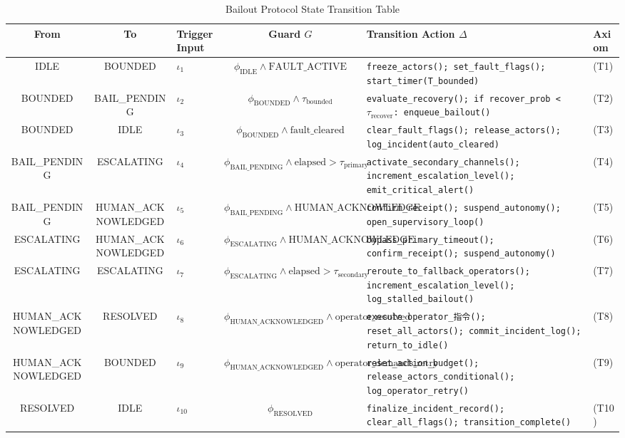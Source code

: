 \begin{table}[htbp]
\centering
\caption{Bailout Protocol State Transition Table}
\label{tab:transitions}
\begin{tabular}{|c|c|l|c|p{4.5cm}|p{3.5cm}|}
\hline
\textbf{From} & \textbf{To} & \textbf{Trigger Input} & \textbf{Guard $G$} & \textbf{Transition Action $\Delta$} & \textbf{Axiom} \\ \hline
IDLE & BOUNDED & $\iota_1$ & $\phi_{\text{IDLE}} \land \text{FAULT\_ACTIVE}$ & \texttt{freeze\_actors(); set\_fault\_flags(); start\_timer(T\_bounded)} & (T1) \\ \hline
BOUNDED & BAIL\_PENDING & $\iota_2$ & $\phi_{\text{BOUNDED}} \land \tau_{\text{bounded}}$ & \texttt{evaluate\_recovery(); if recover\_prob < $\tau_{\text{recover}}$: enqueue\_bailout()} & (T2) \\ \hline
BOUNDED & IDLE & $\iota_3$ & $\phi_{\text{BOUNDED}} \land \text{fault\_cleared}$ & \texttt{clear\_fault\_flags(); release\_actors(); log\_incident(auto\_cleared)} & (T3) \\ \hline
BAIL\_PENDING & ESCALATING & $\iota_4$ & $\phi_{\text{BAIL\_PENDING}} \land \text{elapsed} > \tau_{\text{primary}}$ & \texttt{activate\_secondary\_channels(); increment\_escalation\_level(); emit\_critical\_alert()} & (T4) \\ \hline
BAIL\_PENDING & HUMAN\_ACKNOWLEDGED & $\iota_5$ & $\phi_{\text{BAIL\_PENDING}} \land \text{HUMAN\_ACKNOWLEDGED}$ & \texttt{confirm\_receipt(); suspend\_autonomy(); open\_supervisory\_loop()} & (T5) \\ \hline
ESCALATING & HUMAN\_ACKNOWLEDGED & $\iota_6$ & $\phi_{\text{ESCALATING}} \land \text{HUMAN\_ACKNOWLEDGED}$ & \texttt{bypass\_primary\_timeout(); confirm\_receipt(); suspend\_autonomy()} & (T6) \\ \hline
ESCALATING & ESCALATING & $\iota_7$ & $\phi_{\text{ESCALATING}} \land \text{elapsed} > \tau_{\text{secondary}}$ & \texttt{reroute\_to\_fallback\_operators(); increment\_escalation\_level(); log\_stalled\_bailout()} & (T7) \\ \hline
HUMAN\_ACKNOWLEDGED & RESOLVED & $\iota_8$ & $\phi_{\text{HUMAN\_ACKNOWLEDGED}} \land \text{operator\_resolved}$ & \texttt{execute\_operator\_指令(); reset\_all\_actors(); commit\_incident\_log(); return\_to\_idle()} & (T8) \\ \hline
HUMAN\_ACKNOWLEDGED & BOUNDED & $\iota_9$ & $\phi_{\text{HUMAN\_ACKNOWLEDGED}} \land \text{operator\_demands\_retry}$ & \texttt{reset\_action\_budget(); release\_actors\_conditional(); log\_operator\_retry()} & (T9) \\ \hline
RESOLVED & IDLE & $\iota_{10}$ & $\phi_{\text{RESOLVED}}$ & \texttt{finalize\_incident\_record(); clear\_all\_flags(); transition\_complete()} & (T10) \\ \hline
\end{tabular}
\end{table}

